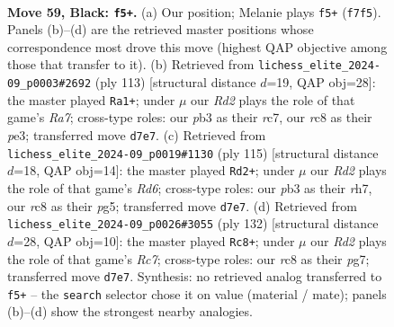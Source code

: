 \documentclass[11pt]{article}
\begin{document}
\clearpage

\begin{figure}[p]\centering
\begin{subfigure}{0.46\textwidth}\centering
\resizebox{\linewidth}{!}{%
\newchessgame
\chessboard[
  setfen={2R5/3r1pk1/8/p6r/4K3/1P6/3p3P/R7 b - - 1 59},
  showmover=false,
  pgfstyle=straightmove, color=movearrow, markmove={f7-f5}
]}
\caption{}
\end{subfigure}\hfill
\begin{subfigure}{0.46\textwidth}\centering
\resizebox{\linewidth}{!}{%
\newchessgame
\chessboard[
  setfen={3r2k1/2R5/1R6/p4Pp1/3P4/4P3/rp6/6K1 b - - 0 57},
  showmover=false,
  pgfstyle=straightmove, color=movearrow, markmove={a2-a1}
]}
\caption{}
\end{subfigure}
\\[4pt]
\begin{subfigure}{0.46\textwidth}\centering
\resizebox{\linewidth}{!}{%
\newchessgame
\chessboard[
  setfen={5k2/7R/r1p5/P3RpP1/8/2pr4/5K2/8 b - - 4 58},
  showmover=false,
  pgfstyle=straightmove, color=movearrow, markmove={d3-d2}
]}
\caption{}
\end{subfigure}\hfill
\begin{subfigure}{0.46\textwidth}\centering
\resizebox{\linewidth}{!}{%
\newchessgame
\chessboard[
  setfen={4k3/1PR1P1p1/1r5p/7P/8/8/6PK/8 w - - 1 67},
  showmover=false,
  pgfstyle=straightmove, color=movearrow, markmove={c7-c8}
]}
\caption{}
\end{subfigure}
\caption{\textbf{Move 59, Black: \texttt{f5+}.} (a) Our position; Melanie plays \texttt{f5+} (\texttt{f7f5}). Panels (b)--(d) are the retrieved master positions whose correspondence most drove this move (highest QAP objective among those that transfer to it). (b) Retrieved from \texttt{lichess\_elite\_2024-09\_p0003\#2692} (ply 113) [structural distance $d$=19, QAP obj=28]: the master played \texttt{Ra1+}; under $\mu$ our \emph{Rd2} plays the role of that game's \emph{Ra7}; cross-type roles: our \emph{p}b3 as their \emph{r}c7, our \emph{r}c8 as their \emph{p}e3; transferred move \texttt{d7e7}. (c) Retrieved from \texttt{lichess\_elite\_2024-09\_p0019\#1130} (ply 115) [structural distance $d$=18, QAP obj=14]: the master played \texttt{Rd2+}; under $\mu$ our \emph{Rd2} plays the role of that game's \emph{Rd6}; cross-type roles: our \emph{p}b3 as their \emph{r}h7, our \emph{r}c8 as their \emph{p}g5; transferred move \texttt{d7e7}. (d) Retrieved from \texttt{lichess\_elite\_2024-09\_p0026\#3055} (ply 132) [structural distance $d$=28, QAP obj=10]: the master played \texttt{Rc8+}; under $\mu$ our \emph{Rd2} plays the role of that game's \emph{Rc7}; cross-type roles: our \emph{r}c8 as their \emph{p}g7; transferred move \texttt{d7e7}. Synthesis: no retrieved analog transferred to \texttt{f5+} -- the \texttt{search} selector chose it on value (material / mate); panels (b)--(d) show the strongest nearby analogies.}
\label{fig:thought-m117}
\end{figure}
\end{document}
